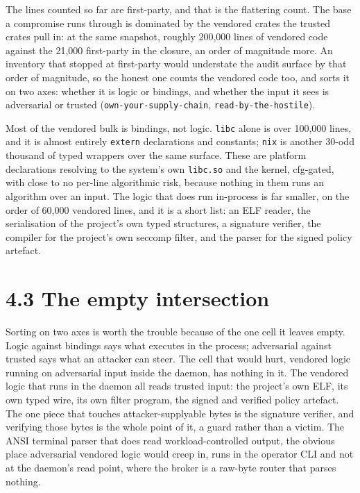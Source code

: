 The lines counted so far are first-party, and that is the flattering
count. The base a compromise runs through is dominated by the vendored
crates the trusted crates pull in: at the same snapshot, roughly 200,000
lines of vendored code against the 21,000 first-party in the closure, an
order of magnitude more. An inventory that stopped at first-party would
understate the audit surface by that order of magnitude, so the honest
one counts the vendored code too, and sorts it on two axes: whether it
is logic or bindings, and whether the input it sees is adversarial or
trusted (\texttt{own-your-supply-chain}, \texttt{read-by-the-hostile}).

Most of the vendored bulk is bindings, not logic. \texttt{libc} alone is
over 100,000 lines, and it is almost entirely \texttt{extern}
declarations and constants; \texttt{nix} is another 30-odd thousand of
typed wrappers over the same surface. These are platform declarations
resolving to the system's own \texttt{libc.so} and the kernel,
cfg-gated, with close to no per-line algorithmic risk, because nothing
in them runs an algorithm over an input. The logic that does run
in-process is far smaller, on the order of 60,000 vendored lines, and it
is a short list: an ELF reader, the serialisation of the project's own
typed structures, a signature verifier, the compiler for the project's
own seccomp filter, and the parser for the signed policy artefact.

\hypertarget{the-empty-intersection}{%
\section{4.3 The empty intersection}\label{the-empty-intersection}}

Sorting on two axes is worth the trouble because of the one cell it
leaves empty. Logic against bindings says what executes in the process;
adversarial against trusted says what an attacker can steer. The cell
that would hurt, vendored logic running on adversarial input inside the
daemon, has nothing in it. The vendored logic that runs in the daemon
all reads trusted input: the project's own ELF, its own typed wire, its
own filter program, the signed and verified policy artefact. The one
piece that touches attacker-supplyable bytes is the signature verifier,
and verifying those bytes is the whole point of it, a guard rather than
a victim. The ANSI terminal parser that does read workload-controlled
output, the obvious place adversarial vendored logic would creep in,
runs in the operator CLI and not at the daemon's read point, where the
broker is a raw-byte router that parses nothing.

